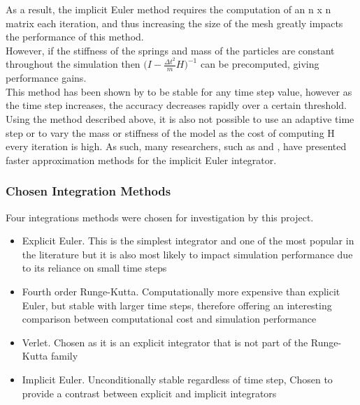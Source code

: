 As a result, the implicit Euler method requires the computation of an n x n matrix each iteration, and thus increasing the size of the mesh greatly impacts the performance of this method.
\\However, if the stiffness of the springs and mass of the particles are constant throughout the simulation then $\bigg(I - \frac{\Delta t^{2}}{m}H\bigg)^{-1}$ can be precomputed, giving performance gains.
\\This method has been shown by \textcite{Volino2001} to be stable for any time step value, however as the time step increases, the accuracy decreases rapidly over a certain threshold. Using the method described above, it is also not possible to use an adaptive time step or to vary the mass or stiffness of the model as the cost of computing H every iteration is high. As such, many researchers, such as \textcite{Mesit2007} and \textcite{Kang2000}, have presented faster approximation methods for the implicit Euler integrator.

\subsubsection{Chosen Integration Methods}
Four integrations methods were chosen for investigation by this project.
\begin{itemize}
\item{Explicit Euler. This is the simplest integrator and one of the most popular in the literature but it is also most likely to impact simulation performance due to its reliance on small time steps}
\item{Fourth order Runge-Kutta. Computationally more expensive than explicit Euler, but stable with larger time steps, therefore offering an interesting comparison between computational cost and simulation performance}
\item{Verlet. Chosen as it is an explicit integrator that is not part of the Runge-Kutta family}
\item{Implicit Euler. Unconditionally stable regardless of time step, Chosen to provide a contrast between explicit and implicit integrators}
\end{itemize}